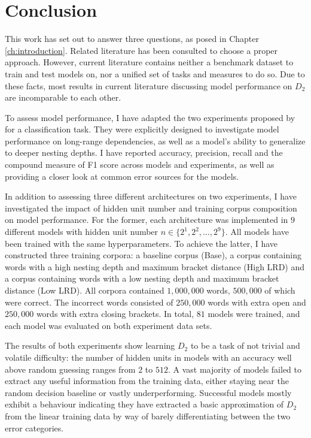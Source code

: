\section{Conclusion}\label{ch:conclusion}
This work has set out to answer three questions, as posed in Chapter \ref{ch:introduction}. Related literature has been consulted to choose a proper approach. However, current literature contains neither a benchmark dataset to train and test models on, nor a unified set of tasks and measures to do so. Due to these facts, most results in current literature discussing model performance on $D_{2}$ are incomparable to each other.

To assess model performance, I have adapted the two experiments proposed by \cite{Bernardy2018} for a classification task. They were explicitly designed to investigate model performance on long-range dependencies, as well as a model's ability to generalize to deeper nesting depths. I have reported accuracy, precision, recall and the compound measure of F1 score across models and experiments, as well as providing a closer look at common error sources for the models.

In addition to assessing three different architectures on two experiments, I have investigated the impact of hidden unit number and training corpus composition on model performance. For the former, each architecture was implemented in $9$ different models with hidden unit number $n \in \lbrace 2^{1}, 2^{2}, \dots, 2^{9} \rbrace$. All models have been trained with the same hyperparameters. To achieve the latter, I have constructed three training corpora: a baseline corpus (Base), a corpus containing words with a high nesting depth and maximum bracket distance (High LRD) and a corpus containing words with a low nesting depth and maximum bracket distance (Low LRD). All corpora contained $1{,}000{,}000$ words, $500{,}000$ of which were correct. The incorrect words consisted of $250{,}000$ words with extra open and $250{,}000$ words with extra closing brackets. In total, $81$ models were trained, and each model was evaluated on both experiment data sets.

The results of both experiments show learning $D_{2}$ to be a task of not trivial and volatile difficulty: the number of hidden units in models with an accuracy well above random guessing ranges from $2$ to $512$. A vast majority of models failed to extract any useful information from the training data, either staying near the random decision baseline or vastly underperforming. Successful models mostly exhibit a behaviour indicating they have extracted a basic approximation of $D_{2}$ from the linear training data by way of barely differentiating between the two error categories.


